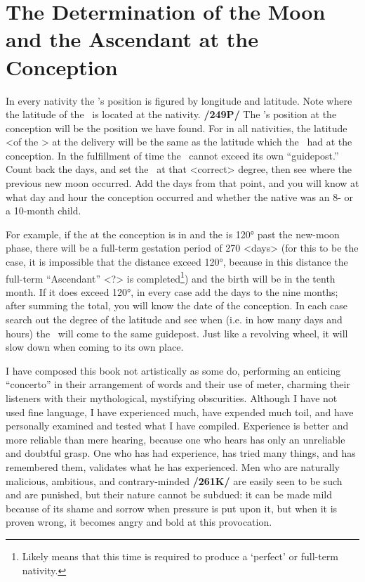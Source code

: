 \section{The Determination of the Moon and the Ascendant at the Conception}
In every nativity the \Moon’s position is figured by longitude and latitude. Note where the latitude of the \Moon\, is located at the nativity. \textbf{/249P/} The \Moon’s position at the conception will be the position we have found. For in all nativities, the latitude <of the \Moon> at the delivery will be the same as the latitude which the \Moon\, had at the conception. In the fulfillment of time the \Moon\, cannot exceed its own “guidepost.” Count back the days, and set the \Moon\, at that <correct> degree, then see where the previous new moon occurred. Add the days from that point, and you will know at what day and hour the conception occurred and whether the native was an 8- or a 10-month child.

For example, if the \Sun\xspace at the conception is in \Aries\xspace and the \Moon\xspace is 120° past the new-moon phase, there will be a full-term gestation period of 270 <days> (for this to be the case, it is impossible that the distance exceed 120°, because in this distance the full-term “Ascendant” <?> is completed\footnote{Likely means that this time is required to produce a `perfect' or full-term nativity.}) and the birth will be in the tenth month. If it does exceed 120°, in every case add the days to the nine months; after summing the total, you will know the date of the conception. In each case search out the degree of the latitude and see when (i.e. in how many days and hours) the \Moon\, will come to the same guidepost. Just like a revolving wheel, it will slow down when coming to its own place. 

I have composed this book not artistically as some do, performing an enticing “concerto” in their arrangement of words and their use of meter, charming their listeners with their mythological, mystifying
obscurities. Although I have not used fine language, I have experienced much, have expended much toil, and have personally examined and tested what I have compiled. Experience is better and more reliable than mere hearing, because one who hears has only an unreliable and doubtful grasp. One who has had experience, has tried many things, and has remembered them, validates what he has experienced. Men who are naturally malicious, ambitious, and contrary-minded \textbf{/261K/} are easily seen to be such and are punished, but their nature cannot be subdued: it can be made mild because of its shame and sorrow when pressure is put upon it, but when it is proven wrong, it becomes angry and bold at this provocation.

